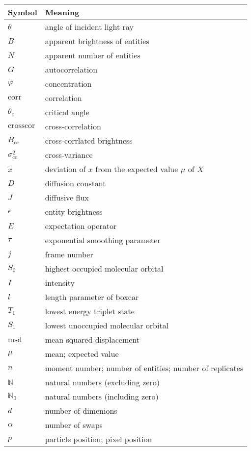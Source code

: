 \documentclass[12pt,]{book}
\theoremstyle{definition}
\theoremstyle{definition}
\theoremstyle{definition}
\theoremstyle{remark}
\begin{document}
\begin{longtable}{l|l}
\hline
Symbol & Meaning\\
\hline
$\theta$ & angle of incident light ray\\
\hline
$B$ & apparent brightness of entities\\
\hline
$N$ & apparent number of entities\\
\hline
$G$ & autocorrelation\\
\hline
$\varphi$ & concentration\\
\hline
$\text{corr}$ & correlation\\
\hline
$\theta_c$ & critical angle\\
\hline
$\text{crosscor}$ & cross-correlation\\
\hline
$B_\text{cc}$ & cross-corrlated brightness\\
\hline
$\sigma^2_\text{cc}$ & cross-variance\\
\hline
$\tilde{x}$ & deviation of $x$ from the expected value $\mu$ of $X$\\
\hline
$D$ & diffusion constant\\
\hline
$J$ & diffusive flux\\
\hline
$\epsilon$ & entity brightness\\
\hline
$E$ & expectation operator\\
\hline
$\tau$ & exponential smoothing parameter\\
\hline
$j$ & frame number\\
\hline
$S_0$ & highest occupied molecular orbital\\
\hline
$I$ & intensity\\
\hline
$l$ & length parameter of boxcar\\
\hline
$T_1$ & lowest energy triplet state\\
\hline
$S_1$ & lowest unoccupied molecular orbital\\
\hline
$\text{msd}$ & mean squared displacement\\
\hline
$\mu$ & mean; expected value\\
\hline
$n$ & moment number; number of entities; number of replicates\\
\hline
$\mathbb{N}$ & natural numbers (excluding zero)\\
\hline
$\mathbb{N}_0$ & natural numbers (including zero)\\
\hline
$d$ & number of dimenions\\
\hline
$\alpha$ & number of swaps\\
\hline
$p$ & particle position; pixel position\\

\end{longtable}
\end{document}
